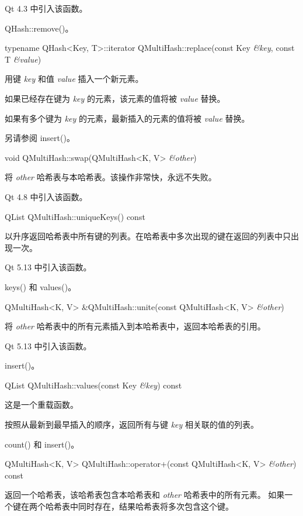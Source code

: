 Qt 4.3 中引入该函数。

\begin{seeAlso}
QHash::remove()。
\end{seeAlso}

typename QHash<Key, T>::iterator QMultiHash::replace(const Key \emph{\&key}, const T \emph{\&value})

用键 \emph{key} 和值 \emph{value} 插入一个新元素。

如果已经存在键为 \emph{key} 的元素，该元素的值将被 \emph{value} 替换。

如果有多个键为 \emph{key} 的元素，最新插入的元素的值将被 \emph{value} 替换。

\begin{seeAlso}
另请参阅 insert()。
\end{seeAlso}

void QMultiHash::swap(QMultiHash<K, V> \emph{\&other})

将 \emph{other} 哈希表与本哈希表。该操作非常快，永远不失败。

Qt 4.8 中引入该函数。

QList QMultiHash::uniqueKeys() const

以升序返回哈希表中所有键的列表。在哈希表中多次出现的键在返回的列表中只出现一次。

Qt 5.13 中引入该函数。

\begin{seeAlso}
keys() 和 values()。
\end{seeAlso}

QMultiHash<K, V> \&QMultiHash::unite(const QMultiHash<K, V> \emph{\&other})

将 \emph{other} 哈希表中的所有元素插入到本哈希表中，返回本哈希表的引用。

Qt 5.13 中引入该函数。

\begin{seeAlso}
insert()。
\end{seeAlso}

QList QMultiHash::values(const Key \emph{\&key}) const

这是一个重载函数。

按照从最新到最早插入的顺序，返回所有与键 \emph{key} 相关联的值的列表。

\begin{seeAlso}
count() 和 insert()。
\end{seeAlso}

QMultiHash<K, V> QMultiHash::operator+(const QMultiHash<K, V> \emph{\&other}) const

返回一个哈希表，该哈希表包含本哈希表和 \emph{other} 哈希表中的所有元素。
如果一个键在两个哈希表中同时存在，结果哈希表将多次包含这个键。

